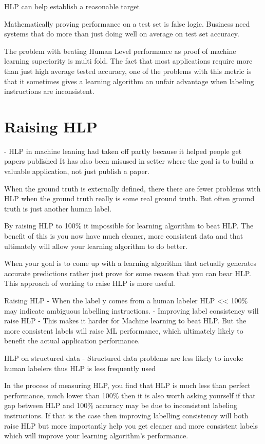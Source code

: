 HLP can help establish a reasonable target

Mathematically proving performance on a test set is false logic.
Business need systems that do more than just doing well on average on test set accuracy.

The problem with beating Human Level performance as proof of machine learning superiority is multi fold.
The fact that most applications require more than just high average tested accuracy, one of the problems with this metric is that it sometimes gives a learning algorithm an unfair advantage when labeling instructions are inconsistent.

\section{Raising HLP}

- HLP in machine leaning had taken off partly because it helped people get papers published %
It has also been misused in setter where the goal is to build a valuable application, not just publish a paper.

When the ground truth is externally defined, there there are fewer problems with HLP when the ground truth really is some real ground truth.
But often ground truth is just another human label.

By raising HLP to 100\% it impossible for learning algorithm to beat HLP.
The benefit of this is you now have much cleaner, more consistent data and that ultimately will allow your learning algorithm to do better.

When your goal is to come up with a learning algorithm that actually generates accurate predictions rather just prove for some reason that you can bear HLP.
This approach of working to raise HLP is more useful.

Raising HLP
- When the label y comes from a human labeler HLP << 100\% may indicate ambiguous labelling instructions.
- Improving label consistency will raise HLP
- This makes  it harder for Machine learning to beat HLP. But the more consistent labels will raise ML performance, which ultimately likely to benefit the actual application performance.


HLP on structured data
- Structured data problems are less likely to invoke human labelers thus HLP is less frequently used

In the process of measuring HLP, you find that HLP is much less than perfect performance, much lower than 100\% then it is also worth asking yourself if that gap between HLP and 100\% accuracy may be due to inconsistent labeling instructions.
If that is the case then improving labelling consistency will both raise HLP but more importantly help you get cleaner and more consistent labels which will improve your learning algorithm's performance.

